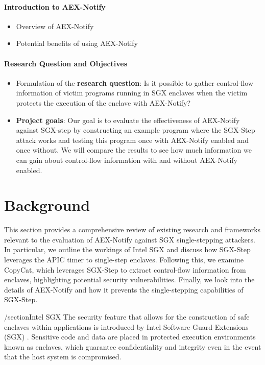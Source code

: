 \documentclass{llncs}
\begin{document}
\paragraph{Introduction to AEX-Notify}
\begin{itemize}
  \item Overview of AEX-Notify
  \item Potential benefits of using AEX-Notify
\end{itemize}

\paragraph{Research Question and Objectives}
\begin{itemize}
  \item Formulation of the \textbf{research question}:
    Is it possible to gather control-flow information of victim programs running
    in SGX enclaves when the victim protects the execution of the enclave with
    AEX-Notify?
  \item \textbf{Project goals}:
    Our goal is to evaluate the effectiveness of AEX-Notify against SGX-step by
    constructing an example program where the SGX-Step attack works and testing
    this program once with AEX-Notify enabled and once without. We will compare
    the results to see how much information we can gain about control-flow
    information with and without AEX-Notify enabled.
\end{itemize}

\section{Background}

This section provides a comprehensive review of existing research and frameworks
relevant to the evaluation of AEX-Notify against SGX single-stepping attackers.
In particular, we outline the workings of Intel SGX and
discuss how SGX-Step leverages the APIC timer to single-step enclaves.
Following this, we examine CopyCat, which leverages SGX-Step to extract
control-flow information from enclaves, highlighting potential security
vulnerabilities.
Finally, we look into the details of AEX-Notify and
how it prevents the single-stepping capabilities of SGX-Step.

/section{Intel SGX}
The security feature that allows for the construction of safe enclaves within applications is introduced by Intel Software Guard Extensions (SGX) \cite{CostanD16}. Sensitive code and data are placed in protected execution environments known as enclaves, which guarantee confidentiality and integrity even in the event that the host system is compromised.
\end{document}

